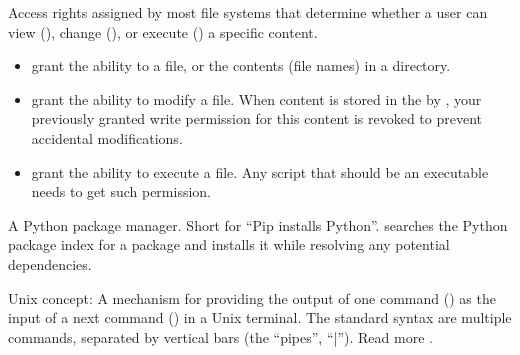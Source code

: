 \begin{description}
\ignorespaces 
\sphinxAtStartPar
Access rights assigned by most file systems that determine whether a user can view (),
change (), or execute () a specific content.
\begin{itemize}
\item {} 
\sphinxAtStartPar
{} grant the ability to a file, or the contents (file names) in a directory.

\item {} 
\sphinxAtStartPar
{} grant the ability to modify a file. When content is stored in the
{\hyperref[\detokenize{glossary:term-object-tree}]{}} by {\hyperref[\detokenize{glossary:term-git-annex}]{}}, your previously granted write permission for this
content is revoked to prevent accidental modifications.

\item {} 
\sphinxAtStartPar
{} grant the ability to execute a file. Any script that should be an executable
needs to get such permission.

\end{itemize}

\ignorespaces 
\sphinxAtStartPar
A Python package manager. Short for “Pip installs Python”. 
searches the Python package index  for a
package and installs it while resolving any potential dependencies.

\ignorespaces 
\sphinxAtStartPar
Unix concept: A mechanism for providing the output of one command ({\hyperref[\detokenize{glossary:term-stdout}]{}}) as the input of a next command ({\hyperref[\detokenize{glossary:term-stdin}]{}}) in a Unix terminal. The standard syntax are multiple commands, separated by vertical bars (the “pipes”, “|”). Read more .


\end{description}
